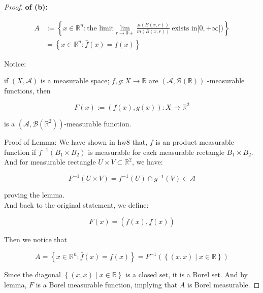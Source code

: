 \documentclass{qlnotes-export}
\begin{document}
\begin{proof}

\textbf{of (b):}

\[\begin{matrix}
A & {:= \left\{ {x \in {\mathbb{R}}^{n}:\text{the limit}\lim\limits_{r\rightarrow 0 +}\frac{\mu(B(x,r))}{m(B(x,r))}\ \text{exists in}\lbrack 0, + \infty\rbrack\text{)}} \right\}} \\
 & {= \left\{ {x \in {\mathbb{R}}^{n}:\bar{f}(x) = \underset{¯}{f}(x)} \right\}}
\end{matrix}\]

Notice:

\begin{lemma}\label{lem-hw11-on-regular-borel-measure-bv-lemma-002}

if \((X,\mathcal{A})\) is a measurable space; \(f,g:X\rightarrow{\mathbb{R}}\) are \((\mathcal{A},\mathcal{B}({\mathbb{R}}))\) -measurable functions, then

\[F(x) := (f(x),g(x)):X\rightarrow{\mathbb{R}}^{2}\]

is a \((\mathcal{A},\mathcal{B}({\mathbb{R}}^{2}))\)-measurable function.

\end{lemma}

Proof of Lemma: We have shown in hw8 that, \(f\) is an product measurable function if \(f^{- 1}\left( {B_{1} \times B_{2}} \right)\) is measurable for each measurable rectangle \(B_{1} \times B_{2}\).\\
And for measurable rectangle \(U \times V \subset {\mathbb{R}}^{2}\), we have:

\[F^{- 1}(U \times V) = f^{- 1}(U) \cap g^{- 1}(V) \in \mathcal{A}\]

proving the lemma.\\
And back to the original statement, we define:

\[F(x) = (\bar{f}(x),\underset{¯}{f}(x))\]

Then we notice that

\[A = \left\{ {x \in {\mathbb{R}}^{n}:\bar{f}(x) = \underset{¯}{f}(x)} \right\} = F^{- 1}(\left\{ (x,x) \middle| x \in {\mathbb{R}} \right\})\]

Since the diagonal \(\left\{ (x,x) \middle| x \in {\mathbb{R}} \right\}\) is a closed set, it is a Borel set. And by lemma, \(F\) is a Borel measurable function, implying that \(A\) is Borel measurable.

\end{proof}
\end{document}
